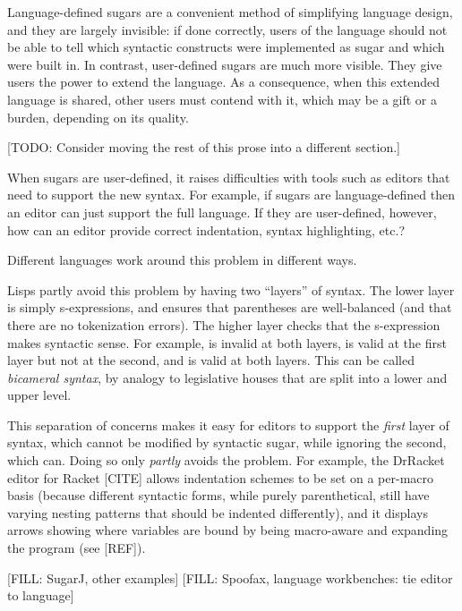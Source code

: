 Language-defined sugars are a convenient method of simplifying
language design, and they are largely invisible: if done correctly,
users of the language should not be able to tell which syntactic
constructs were implemented as sugar and which were built in.
In contrast, user-defined sugars are much more visible. They give
users the power to extend the language. As a consequence, when
this extended language is shared, other users must contend with it,
which may be a gift or a burden, depending on its quality.

[TODO: Consider moving the rest of this prose into a different section.]

When sugars are user-defined, it raises difficulties with tools such
as editors that need to support the new syntax. For example, if sugars
are language-defined then an editor can just support the full
language. If they are user-defined, however, how can an editor provide
correct indentation, syntax highlighting, etc.?

Different languages work around this problem in different ways.

Lisps partly avoid this problem by having two ``layers'' of syntax.
The lower layer is simply s-expressions, and ensures that parentheses
are well-balanced (and that there are no tokenization errors).
The higher layer checks that the s-expression makes syntactic sense.
For example,  is invalid at both layers,
 is valid at the first layer but not at the
second, and  is valid at both layers.
This can be called \emph{bicameral syntax}, by analogy to legislative
houses that are split into a lower and upper level.

This separation of concerns makes it easy for editors to support the
\emph{first} layer of syntax, which cannot be modified by syntactic
sugar, while ignoring the second, which can. Doing so only
\emph{partly} avoids the problem. For example, the DrRacket editor for
Racket [CITE] allows indentation schemes to be set on a per-macro
basis (because different syntactic forms, while purely parenthetical,
still have varying nesting patterns that should be indented
differently), and it displays arrows showing where variables are bound
by being macro-aware and expanding the program (see [REF]).

[FILL: SugarJ, other examples]
[FILL: Spoofax, language workbenches: tie editor to language]


